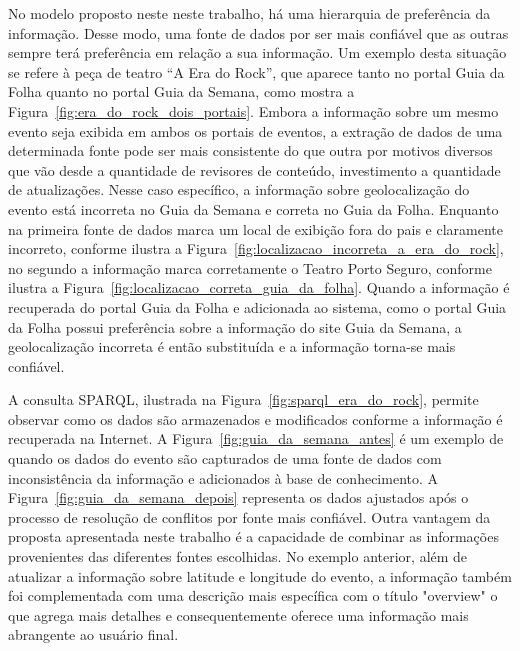 No modelo proposto neste neste trabalho, há uma hierarquia de preferência da informação. Desse modo, uma fonte de dados por ser mais confiável que as outras sempre terá preferência em relação a sua informação. Um exemplo desta situação se refere à peça de teatro ``A Era do Rock'',  que aparece tanto no portal Guia da Folha quanto no portal Guia da Semana, como mostra a Figura~\ref{fig:era_do_rock_dois_portais}. Embora a informação sobre um mesmo evento seja exibida em ambos os portais de eventos, a extração de dados de uma determinada fonte pode ser mais consistente do que outra por motivos diversos que vão desde a quantidade de revisores de conteúdo, investimento a quantidade de atualizações. Nesse caso específico, a informação sobre geolocalização do evento está incorreta no Guia da Semana e correta no Guia da Folha. Enquanto na primeira fonte de dados marca  um local de exibição fora do pais e claramente incorreto, conforme ilustra a Figura~\ref{fig:localizacao_incorreta_a_era_do_rock}, no segundo a informação marca corretamente o Teatro Porto Seguro, conforme ilustra a Figura~\ref{fig:localizacao_correta_guia_da_folha}. Quando a informação é recuperada do portal Guia da Folha e adicionada ao sistema, como o portal Guia da Folha possui preferência sobre a informação do site Guia da Semana, a geolocalização incorreta é então substituída e a informação torna-se mais confiável.

A consulta SPARQL, ilustrada na Figura~\ref{fig:sparql_era_do_rock}, permite observar como os dados são armazenados e modificados conforme a informação é recuperada na Internet. A Figura~\ref{fig:guia_da_semana_antes} é um exemplo de quando os dados do evento são capturados de uma fonte de dados com inconsistência da informação e adicionados à base de conhecimento. A Figura~\ref{fig:guia_da_semana_depois} representa os dados ajustados após o processo de resolução de conflitos por fonte mais confiável. Outra vantagem da proposta apresentada neste trabalho é a capacidade de combinar as informações provenientes das diferentes fontes escolhidas. No exemplo anterior, além de atualizar a informação sobre latitude e longitude do evento, a informação também foi complementada com uma descrição mais específica com o título "overview" o que agrega mais detalhes e consequentemente oferece uma informação mais abrangente ao usuário final.

